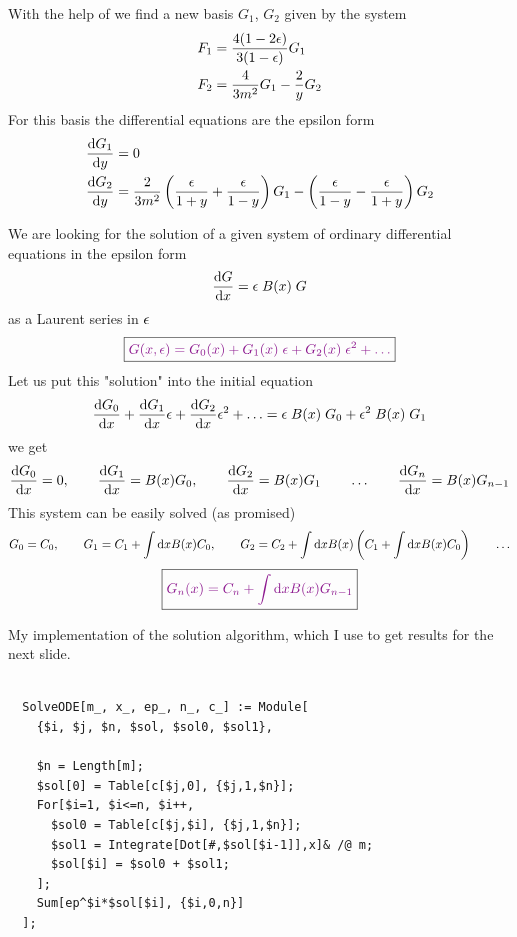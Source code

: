 \documentclass[11pt]{article}
\newcommand{\titlebox}[1]{\centerline{\color{black}\shadowbox{\begin{Bcenter}{\Large \color{Blue} #1}\end{Bcenter}}}}
\newcommand{\bbox}[1]{\color{black}\boxed{{\color{Plum}#1}}}
\begin{document}
With the help of \fuchsia we find a new basis $G_1$, $G_2$ given by the system
  $$
    \begin{aligned}
     F_1 & = \frac{4(1-2\epsilon)}{3(1-\epsilon)} G_1
     \\
     F_2 & = \frac{4}{3m^2} G_1 - \frac{2}{y} G_2
    \end{aligned}
  $$%
For this basis the differential equations are the epsilon form
  $$
    \begin{aligned}
     \frac{\mathrm{d} G_1}{\mathrm{d} y} & = 0
     \\
     \frac{\mathrm{d} G_2}{\mathrm{d} y} & = \frac{2}{3m^2}\left( \frac{\epsilon}{1+y}+\frac{\epsilon}{1-y} \right) G_1 - \left(\frac{\epsilon}{1-y}-\frac{\epsilon}{1+y}\right) G_2
    \end{aligned}
  $$
\newpage


\titlebox{Solutions}
We are looking for the solution of a given system of ordinary differential equations in the epsilon form
$$
\frac{\mathrm{d} G}{\mathrm{d} x} = \epsilon \; B(x) \; G
$$%
as a Laurent series in $\epsilon$
$$
  \bbox{
  G(x,\eps) = G_0(x) + G_1(x) \x \eps + G_2(x) \x \eps^2 + \ldots}
$$%
Let us put this "solution" into the initial equation
$$
\frac{\mathrm{d} G_0}{\mathrm{d} x} + \frac{\mathrm{d} G_1}{\mathrm{d} x} \epsilon + \frac{\mathrm{d} G_2}{\mathrm{d} x} \epsilon^2 + \ldots = \epsilon \; B(x) \; G_0 + \epsilon^2 \; B(x) \; G_1
$$%
we get
$$
 \frac{\mathrm{d} G_0}{\mathrm{d} x} = 0,
 \qquad
 \frac{\mathrm{d} G_1}{\mathrm{d} x} = B(x) G_0,
 \qquad
 \frac{\mathrm{d} G_2}{\mathrm{d} x} = B(x) G_1
 \qquad
 \ldots
 \qquad
 \frac{\mathrm{d} G_{n}}{\mathrm{d} x} = B(x) G_{n-1}
$$%
This system can be easily solved (as promised)
$$
 G_0 = C_0,
 \qquad
 G_1 = C_1 + \int \mathrm{d} x B(x) C_0,
 \qquad
 G_2 = C_2 + \int \mathrm{d} x B(x) \left( C_1 + \int \mathrm{d} x B(x) C_0\right)
 \qquad
 \ldots
$$
$$
\bbox{
 G_n(x) = C_n + \int \D x B(x) G_{n-1}
}
$$
\newpage


\titlebox{Solutions}

My implementation of the solution algorithm, which I use to get results for the next slide.
\vs

\begin{Verbatim}[fontsize=\small,frame=lines, label=\fbox{Mathematica}]

  SolveODE[m_, x_, ep_, n_, c_] := Module[
    {$i, $j, $n, $sol, $sol0, $sol1},

    $n = Length[m];
    $sol[0] = Table[c[$j,0], {$j,1,$n}];
    For[$i=1, $i<=n, $i++,
      $sol0 = Table[c[$j,$i], {$j,1,$n}];
      $sol1 = Integrate[Dot[#,$sol[$i-1]],x]& /@ m;
      $sol[$i] = $sol0 + $sol1;
    ];
    Sum[ep^$i*$sol[$i], {$i,0,n}]
  ];

\end{Verbatim}
\newpage
\end{document}
